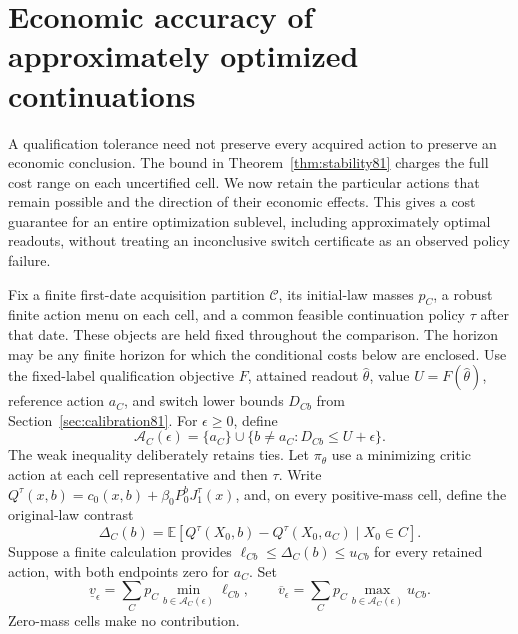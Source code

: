 \section{Economic accuracy of approximately optimized continuations}\label{sec:actionwise82}
A qualification tolerance need not preserve every acquired action to preserve an economic conclusion. The bound in Theorem~\ref{thm:stability81} charges the full cost range on each uncertified cell. We now retain the particular actions that remain possible and the direction of their economic effects. This gives a cost guarantee for an entire optimization sublevel, including approximately optimal readouts, without treating an inconclusive switch certificate as an observed policy failure.

Fix a finite first-date acquisition partition $\mathcal C$, its initial-law masses $p_C$, a robust finite action menu on each cell, and a common feasible continuation policy $\tau$ after that date. These objects are held fixed throughout the comparison. The horizon may be any finite horizon for which the conditional costs below are enclosed. Use the fixed-label qualification objective $F$, attained readout $\widehat\theta$, value $U=F(\widehat\theta)$, reference action $a_C$, and switch lower bounds $D_{Cb}$ from Section~\ref{sec:calibration81}. For $\epsilon\ge0$, define
\begin{equation}\label{eq:possible-actions82}
 \mathcal A_C(\epsilon)=\{a_C\}\cup
       \{b\ne a_C:D_{Cb}\le U+\epsilon\}.
\end{equation}
The weak inequality deliberately retains ties. Let $\pi_\theta$ use a minimizing critic action at each cell representative and then $\tau$. Write $Q^\tau(x,b)=c_0(x,b)+\beta_0P_0^bJ_1^\tau(x)$, and, on every positive-mass cell, define the original-law contrast
\[
 \Delta_C(b)=\mathbb E[Q^\tau(X_0,b)-Q^\tau(X_0,a_C)\mid X_0\in C].
\]
Suppose a finite calculation provides $\ell_{Cb}\le\Delta_C(b)\le u_{Cb}$ for every retained action, with both endpoints zero for $a_C$. Set
\begin{equation}\label{eq:class-band82}
 \underline v_\epsilon=\sum_Cp_C\min_{b\in\mathcal A_C(\epsilon)}\ell_{Cb},
 \qquad
 \overline v_\epsilon=\sum_Cp_C\max_{b\in\mathcal A_C(\epsilon)}u_{Cb}.
\end{equation}
Zero-mass cells make no contribution.

